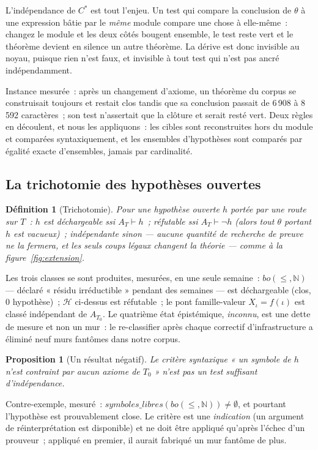 \documentclass[11pt]{article}
\newtheorem{definition}{Définition}
\newtheorem{proposition}{Proposition}
\theoremstyle{remark}\newtheorem{example}{Exemple}
\begin{document}
L'indépendance de $C^\ast$ est tout l'enjeu. Un test qui compare la conclusion de
$\theta$ à une expression bâtie par le \emph{même} module compare une chose à
elle-même~: changez le module et les deux côtés bougent ensemble, le test reste vert
et le théorème devient en silence un autre théorème. La dérive est donc invisible au
noyau, puisque rien n'est faux, et invisible à tout test qui n'est pas ancré
indépendamment.

Instance mesurée~: après un changement d'axiome, un théorème du corpus se construisait
toujours et restait clos tandis que sa conclusion passait de 6\,908 à 8\,592
caractères~; son test n'assertait que la clôture et serait resté vert. Deux règles en
découlent, et nous les appliquons~: les cibles sont reconstruites hors du module et
comparées syntaxiquement, et les ensembles d'hypothèses sont comparés par égalité
exacte d'ensembles, jamais par cardinalité.

\subsection{La trichotomie des hypothèses ouvertes}
\label{sec:trichotomy}
\begin{definition}[Trichotomie]
Pour une hypothèse ouverte $h$ portée par une route sur $T$~:
$h$ est \emph{déchargeable} ssi $A_T \vdash h$~;
\emph{réfutable} ssi $A_T \vdash \neg h$ (alors tout $\theta$ portant $h$ est vacueux)~;
\emph{indépendante} sinon --- aucune quantité de recherche de preuve ne la fermera, et
les seuls coups légaux changent la théorie --- comme à la
figure~\ref{fig:extension}.
\end{definition}

Les trois classes se sont produites, mesurées, en une seule semaine~:
$bo(\le,\mathbb{N})$ --- déclaré « résidu irréductible » pendant des semaines --- est
déchargeable (clos, 0 hypothèse)~; $\mathcal{H}$ ci-dessus est réfutable~; le pont
famille-valeur $X_\iota = f(\iota)$ est classé indépendant de $A_{T_0}$. Le quatrième
état épistémique, \emph{inconnu}, est une dette de mesure et non un mur~: le
re-classifier après chaque correctif d'infrastructure a éliminé neuf murs fantômes dans
notre corpus.

\begin{proposition}[Un résultat négatif]
Le critère syntaxique « un symbole de $h$ n'est contraint par aucun axiome de $T_0$ »
n'est \emph{pas} un test suffisant d'indépendance.
\end{proposition}
Contre-exemple, mesuré~: $\mathit{symboles\_libres}(bo(\le,\mathbb{N})) \neq
\emptyset$, et pourtant l'hypothèse est prouvablement close. Le critère est une
\emph{indication} (un argument de réinterprétation est disponible) et ne doit être
appliqué qu'après l'échec d'un prouveur~; appliqué en premier, il aurait fabriqué un
mur fantôme de plus.
\end{document}
